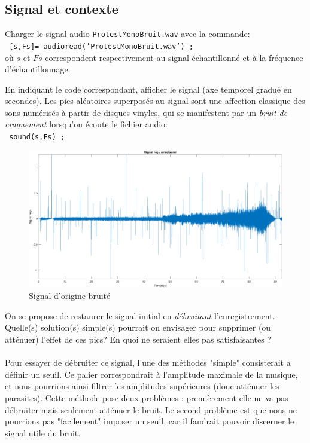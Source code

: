 \documentclass{article}
\begin{document}
\subsection{Signal et contexte}
Charger le signal audio {\tt ProtestMonoBruit.wav} avec la commande:\\[1mm]
{\tt
[s,Fs]= audioread('ProtestMonoBruit.wav') ;\\[1mm]
}
où $s$ et $Fs$ correspondent respectivement au signal échantillonné et à la fréquence d'échantillonnage.

En indiquant le code correspondant, afficher le signal (axe temporel gradué en secondes). Les pics aléatoires superposés au signal sont une affection classique des sons numérisés à partir de disques vinyles, qui se manifestent par un  \textit{bruit de craquement} lorsqu'on écoute le fichier audio:\\[1mm]
{\tt
sound(s,Fs) ;\\[2mm]
}
\begin{figure}[!h] 	
    \centering
    \includegraphics[width=1\textwidth]{images/signalorigine.png}
    \caption{Signal d'origine bruité}
    \label{fig-binaire}
\end{figure}

On se propose de restaurer le signal initial en {\em débruitant} l'enregistrement.\\
Quelle(s) solution(s) simple(s) pourrait on envisager pour supprimer (ou atténuer) l'effet de ces pics? En quoi ne seraient elles pas satisfaisantes ?\\ 
\\
Pour essayer de débruiter ce signal, l'une des méthodes "simple"  consisterait a définir un seuil. Ce palier correspondrait à  l'amplitude maximale de la musique, et nous pourrions ainsi filtrer les amplitudes supérieures (donc atténuer les parasites). Cette méthode pose deux problèmes : premièrement elle ne va pas débruiter mais seulement atténuer le bruit. Le second problème est que nous ne pourrions pas "facilement" imposer un seuil, car il faudrait pouvoir discerner le signal utile du bruit. \newline
\end{document}
